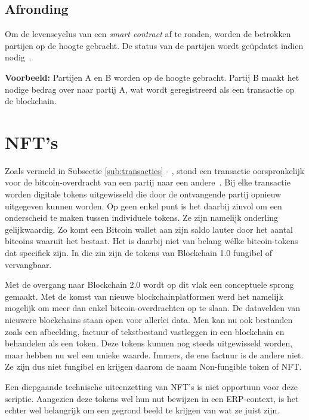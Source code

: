 \subsection{Afronding}
\label{sub:afronding}

Om de levenscyclus van een \textit{smart contract} af te ronden, worden de betrokken partijen op de hoogte gebracht. De status van de partijen wordt geüpdatet indien nodig~\autocite{Zheng2019}.

\textbf{Voorbeeld:}
Partijen A en B worden op de hoogte gebracht. Partij B maakt het nodige bedrag over naar partij A, wat wordt geregistreerd als een transactie op de blockchain.



\section{NFT's}
\label{sec:nfts}

Zoals vermeld in Subsectie \ref{sub:transacties} - , stond een transactie oorspronkelijk voor de bitcoin-overdracht van een partij naar een andere~\autocite{Pierro2017}. Bij elke transactie worden digitale tokens uitgewisseld die door de ontvangende partij opnieuw uitgegeven kunnen worden. Op geen enkel punt is het daarbij zinvol om een onderscheid te maken tussen individuele tokens. Ze zijn namelijk onderling gelijkwaardig. Zo komt een Bitcoin wallet aan zijn saldo lauter door het aantal bitcoins waaruit het bestaat. Het is daarbij niet van belang wélke bitcoin-tokens dat specifiek zijn. In die zin zijn de tokens van Blockchain 1.0 fungibel of vervangbaar.

Met de overgang naar Blockchain 2.0 wordt op dit vlak een conceptuele sprong gemaakt. Met de komst van nieuwe blockchainplatformen werd het namelijk mogelijk om meer dan enkel bitcoin-overdrachten op te slaan. De datavelden van nieuwere blockchains staan open voor allerlei data. Men kan nu ook bestanden zoals een afbeelding, factuur of tekstbestand vastleggen in een blockchain en behandelen als een token. Deze tokens kunnen nog steeds uitgewisseld worden, maar hebben nu wel een unieke waarde. Immers, de ene factuur is de andere niet. Ze zijn dus niet fungibel en krijgen daarom de naam Non-fungible token of NFT.

Een diepgaande technische uiteenzetting van NFT's is niet opportuun voor deze scriptie. Aangezien deze tokens wel hun nut bewijzen in een ERP-context, is het echter wel belangrijk om een gegrond beeld te krijgen van wat ze juist zijn.

